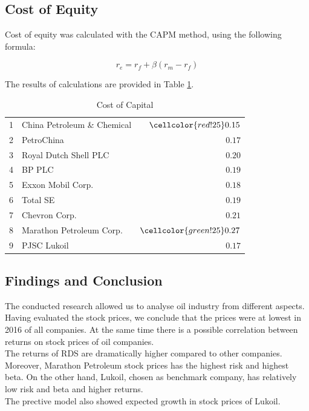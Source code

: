 \documentclass [a4paper, 11pt] {article}
\begin{document}
\clearpage
\subsection {Cost of Equity}

Cost of equity was calculated with the CAPM method, using the following formula:

$$ r_e = r_f + \beta (r_m - r_f)$$

The results of calculations are provided in Table \ref{tab:r_e}.

\begin{table}[!h]
\caption{Cost of Capital\label{r}} 
\begin{center}
\begin{tabular}{llr}
\hline\hline
1&China Petroleum \& Chemical&$ \cellcolor{red!25} 0.15$\tabularnewline
2&PetroChina&$0.17$\tabularnewline
3&Royal Dutch Shell PLC&$0.20$\tabularnewline
4&BP PLC&$0.19$\tabularnewline
5&Exxon Mobil Corp.&$0.18$\tabularnewline
6&Total SE&$0.19$\tabularnewline
7&Chevron Corp.&$0.21$\tabularnewline
8&Marathon Petroleum Corp.&$ \cellcolor{green!25}0.27$\tabularnewline
9&PJSC Lukoil&$0.17$\tabularnewline
\hline
\end{tabular}\end{center}
\label{tab:r_e}
\end{table}



\clearpage
\subsection {Findings and Conclusion}
The conducted research allowed us to analyse oil industry from different aspects. \\
Having evaluated the stock prices, we conclude that the prices were at lowest in 2016 of all companies.
At the same time there is a possible correlation between returns on stock prices of oil companies. \\
The returns of RDS are dramatically higher compared to other companies. \\
Moreover, Marathon Petroleum stock prices has the highest risk and highest beta. On the other hand, Lukoil, chosen as benchmark company, has relatively low risk and beta and higher returns.\\
The prective model also showed expected growth in stock prices of Lukoil.

\clearpage
\newpage
\printbibliography [heading=bibintoc]
\end{document}
